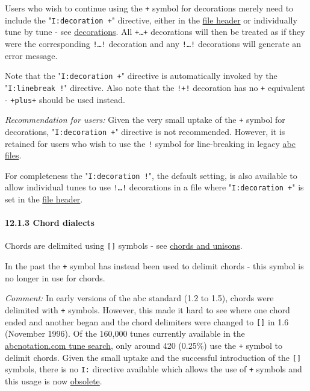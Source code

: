 \documentclass[oneside]{book}
\let\oldparagraph\paragraph
\renewcommand{\paragraph}[1]{\oldparagraph{#1}\mbox{}}
\begin{document}
Users who wish to continue using the \texttt{+} symbol for decorations
merely need to include the "\texttt{I:decoration\ +}" directive, either
in the \protect\hyperlink{file_header_definition}{file header} or
individually tune by tune - see
\protect\hyperlink{decorations}{decorations}. All \texttt{+\ldots{}+}
decorations will then be treated as if they were the corresponding
\texttt{!\ldots{}!} decoration and any \texttt{!\ldots{}!} decorations
will generate an error message.

Note that the "\texttt{I:decoration\ +}" directive is automatically
invoked by the "\texttt{I:linebreak\ !}" directive. Also note that the
\texttt{!+!} decoration has no \texttt{+} equivalent - \texttt{+plus+}
should be used instead.

\emph{Recommendation for users:} Given the very small uptake of the
\texttt{+} symbol for decorations, "\texttt{I:decoration\ +}" directive
is not recommended. However, it is retained for users who wish to use
the \texttt{!} symbol for line-breaking in legacy
\protect\hyperlink{abc_file_definition}{abc files}.

For completeness the "\texttt{I:decoration\ !}", the default setting, is
also available to allow individual tunes to use \texttt{!\ldots{}!}
decorations in a file where "\texttt{I:decoration\ +}" is set in the
\protect\hyperlink{file_header_definition}{file header}.

\hypertarget{chord_dialects}{\paragraph{12.1.3 Chord
dialects}\label{chord_dialects}}

Chords are delimited using \texttt{{[}{]}} symbols - see
\protect\hyperlink{chords_and_unisons}{chords and unisons}.

In the past the \texttt{+} symbol has instead been used to delimit
chords - this symbol is no longer in use for chords.

\emph{Comment:} In early versions of the abc standard (1.2 to 1.5),
chords were delimited with \texttt{+} symbols. However, this made it
hard to see where one chord ended and another began and the chord
delimiters were changed to \texttt{{[}{]}} in 1.6 (November 1996). Of
the 160,000 tunes currently available in the
\href{http://abcnotation.com/search}{abcnotation.com tune search}, only
around 420 (0.25\%) use the \texttt{+} symbol to delimit chords. Given
the small uptake and the successful introduction of the \texttt{{[}{]}}
symbols, there is no \texttt{I:} directive available which allows the
use of \texttt{+} symbols and this usage is now
\protect\hyperlink{outdated_syntax}{obsolete}.
\end{document}
